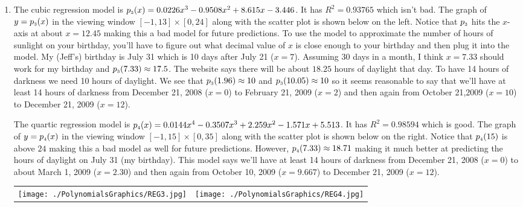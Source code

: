 \begin{enumerate}
\setcounter{enumi}{\value{HW}}


\item The cubic regression model is $p_{\mbox{\tiny $3$}}(x) = 0.0226x^{3} - 0.9508x^{2} + 8.615x - 3.446$.  It has $R^{2} = 0.93765$ which isn't bad.  The graph of $y = p_{\mbox{\tiny $3$}}(x)$ in the viewing window $[-1,13] \times [0, 24]$ along with the scatter plot is shown below on the left.  Notice that $p_{\mbox{\tiny $3$}}$ hits the $x$-axis at about $x = 12.45$ making this a bad model for future predictions.  To use the model to approximate the number of hours of sunlight on your birthday, you'll have to figure out what decimal value of $x$ is close enough to your birthday and then plug it into the model.  My (Jeff's) birthday is July 31 which is 10 days after July 21 ($x = 7$).  Assuming 30 days in a month, I think $x = 7.33$ should work for my birthday and $p_{\mbox{\tiny $3$}}(7.33) \approx 17.5$.  The website says there will be about $18.25$ hours of daylight that day.  To have 14 hours of darkness we need 10 hours of daylight.  We see that $p_{\mbox{\tiny $3$}}(1.96) \approx 10$ and $p_{\mbox{\tiny $3$}}(10.05) \approx 10$ so it seems reasonable to say that we'll have at least 14 hours of darkness from December 21, 2008 ($x = 0$) to February 21, 2009 ($x = 2$) and then again from October 21,2009 ($x = 10$) to December 21, 2009 ($x = 12$).

\smallskip

The quartic regression model is $p_{\mbox{\tiny $4$}}(x) = 0.0144x^{4} - 0.3507x^{3} + 2.259x^{2} - 1.571x + 5.513$.  It has $R^{2} = 0.98594$ which is good.  The graph of $y = p_{\mbox{\tiny $4$}}(x)$ in the viewing window $[-1, 15] \times [0, 35]$ along with the scatter plot is shown below on the right.  Notice that $p_{\mbox{\tiny $4$}}(15)$ is above $24$ making this a bad model as well for future predictions.  However, $p_{\mbox{\tiny $4$}}(7.33) \approx 18.71$ making it much better at predicting the hours of daylight on July 31 (my birthday).  This model says we'll have at least 14 hours of darkness from December 21, 2008 ($x = 0$) to about March 1, 2009 ($x = 2.30$) and then again from October 10, 2009 ($x = 9.667$) to December 21, 2009 ($x = 12$).

\begin{center}

\begin{tabular}{cc}

\texttt{[image: ./PolynomialsGraphics/REG3.jpg]} \hspace{.25in} & \texttt{[image: ./PolynomialsGraphics/REG4.jpg]} \\


\end{tabular}
\end{center}
\end{enumerate}
